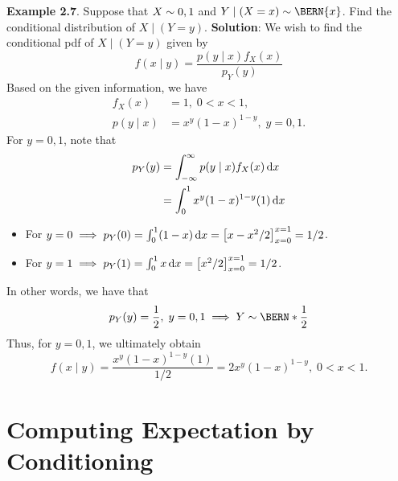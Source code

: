 \begin{Example}
    \textbf{Example 2.7}. Suppose that $ X \sim \relax{0,1} $ and $ Y\mid(X=x)\sim \BERN{x} $. Find the conditional distribution of $ X\mid(Y=y) $.
    \tcblower{}
    \textbf{Solution}: We wish to find the conditional pdf of $ X\mid (Y=y) $ given by
    \[ f(x\mid y)=\frac{p(y\mid x)f_X(x)}{p_Y(y)} \]
    Based on the given information, we have
    \begin{align*}
        f_X(x)     & =1,\;0<x<1,              \\
        p(y\mid x) & =x^y(1-x)^{1-y},\;y=0,1.
    \end{align*}
    For $ y=0,1 $, note that
    \begin{align*}
        p_Y(y)
         & =\int_{-\infty}^{\infty}p(y\mid x)f_X(x)\odif{x} \\
         & =\int_{0}^{1}x^y (1-x)^{1-y}(1)\odif{x}
    \end{align*}
    \begin{itemize}
        \item For $ y=0\implies p_Y(0)=\int_{0}^{1}(1-x)\odif{x}=\bigl[x-x^2/2\bigr]_{x=0}^{x=1}=1/2 $.
        \item For $ y=1\implies p_Y(1)=\int_{0}^{1}x\odif{x}=\bigl[x^2/2\bigr]_{x=0}^{x=1}=1/2 $.
    \end{itemize}
    In other words, we have that
    \[ p_Y(y)=\frac{1}{2} ,\; y=0,1\implies Y \sim \BERN*{\frac{1}{2} } \]
    Thus, for $ y=0,1 $, we ultimately obtain
    \[ f(x\mid y)=\frac{x^y(1-x)^{1-y}(1)}{1/2}=2x^y(1-x)^{1-y},\; 0<x<1. \]
\end{Example}
\section{Computing Expectation by Conditioning}
